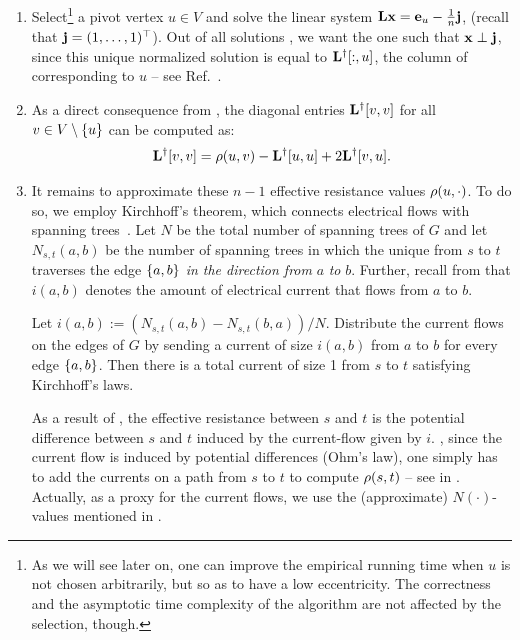 \begin{enumerate}
\item Select\footnote{As we will see later on, one can improve the empirical running time
when $u$ is not chosen arbitrarily, but so as to have a low eccentricity. The correctness
and the asymptotic time complexity of the algorithm are not affected by the selection, though.}
a pivot vertex $u \in V$ and solve the linear system $\mathbf{L}\mathbf{x} = \mathbf{e}_{u} - \frac{1}{n}\mathbf{j}$,
(recall that $\mathbf{j} = (1, \ldots, 1)^\top$).
Out of all solutions , we want the one such that $\mathbf{x} \perp \mathbf{j}$,
since this unique normalized solution is equal to $\mathbf{L}^\dagger[:, u]$, \ie the column of
\Linv corresponding to $u$ -- see Ref.~\cite[pp. 6-7]{van2017pseudoinverse}.

\item As a direct consequence from , the diagonal entries $\mathbf{L}^\dagger[v, v]$
for all $v\in V\setminus\set{u}$ can be computed as:
%
\[\mathbf{L}^\dagger[v, v] = \rho(u, v) - \mathbf{L}^\dagger[u, u] + 2\mathbf{L}^\dagger[v, u].\]

\item It remains to approximate these $n - 1$ effective resistance values $\rho(u, \cdot)$.
To do so, we employ Kirchhoff's theorem, which connects electrical flows with spanning
trees~\cite[Ch. II]{DBLP:books/daglib/0009415}. Let $N$ be the total number of spanning trees
of $G$ and let $N_{s, t}(a, b)$ be the number of spanning trees in which the unique from $s$
to $t$ traverses the edge $\set{a, b}$ \emph{in the direction from} $a$ \emph{to} $b$.
Further, recall from  that $i(a, b)$ denotes the amount of
electrical current that flows from $a$ to $b$.

\begin{theorem}
\label{theo:el-clos:kirchhoff}
Let $i(a, b) := (N_{s, t}(a, b) - N_{s, t}(b, a)) / N$. Distribute the current
flows on the edges of $G$ by sending a current of size $i(a, b)$ from $a$ to
$b$ for every edge $\set{a, b}$. Then there is a total current of size 1 from
$s$ to $t$ satisfying Kirchhoff's laws.
\end{theorem}

As a result of , the effective resistance between $s$ and $t$
is the potential difference between $s$ and $t$ induced by the current-flow given by $i$.
, since the current flow is induced by potential differences
(Ohm's law), one simply has to add the currents on a path from $s$ to $t$ to
compute $\rho(s, t)$ -- see  in
. Actually, as a proxy for the current flows, we
use the (approximate) $N(\cdot)$-values mentioned in
.


\end{enumerate}
